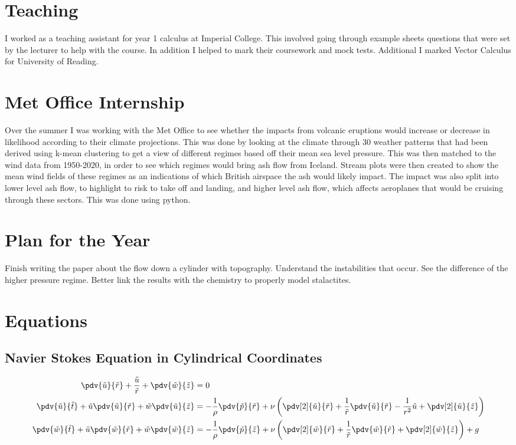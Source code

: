 \documentclass[12pt]{article}
\begin{document}
\section{Teaching}
I worked as a teaching assistant for year 1 calculus at Imperial College. This involved going through example sheets questions that were set by the lecturer to help with the course. In addition I helped to mark their coursework and mock tests. Additional I marked Vector Calculus for University of Reading.

\section{Met Office Internship}
Over the summer I was working with the Met Office to see whether the impacts from volcanic eruptions would increase or decrease in likelihood according to their climate projections. This was done by looking at the climate through 30 weather patterns that had been derived using k-mean clustering to get a view of different regimes based off their mean sea level pressure. This was then matched to the wind data from 1950-2020, in order to see which regimes would bring ash flow from Iceland. Stream plots were then created to show the mean wind fields of these regimes as an indications of which British airspace the ash would likely impact. The impact was also split into lower level ash flow, to highlight to risk to take off and landing, and higher level ash flow, which affects aeroplanes that would be cruising through these sectors. This was done using python.
\section{Plan for the Year}

Finish writing the paper about the flow down a cylinder with topography. 
Understand the instabilities that occur. See the difference of the higher pressure regime. Better link the results with the chemistry to properly model stalactites.
\appendix
\section{Equations}
\subsection{Navier Stokes Equation in Cylindrical Coordinates \label{eqs}}

\begin{align}
\pdv{\tilde u}{\tilde r}+\frac{\tilde u}{\tilde r}+\pdv{\tilde w}{\tilde z}&=0\\
\pdv{\tilde u}{\tilde t}+\tilde u\pdv{\tilde u}{\tilde r}+\tilde w\pdv{\tilde u}{\tilde z}&=-\frac{1}{\rho}\pdv{\tilde p}{\tilde r}+\nu\left(\pdv[2]{\tilde u}{\tilde r}+\frac{1}{\tilde r}\pdv{\tilde u}{\tilde r}-\frac{1}{r^2}\tilde u+\pdv[2]{\tilde u}{\tilde z}\right)\\
\pdv{\tilde w}{\tilde t}+\tilde u\pdv{\tilde w}{\tilde r}+\tilde w\pdv{\tilde w}{\tilde z}&=-\frac{1}{\rho}\pdv{\tilde p}{\tilde z}+\nu\left(\pdv[2]{\tilde w}{\tilde r}+\frac{1}{\tilde r}\pdv{\tilde w}{\tilde r}+\pdv[2]{\tilde w}{\tilde z}\right) + g 
\end{align}
\end{document}
